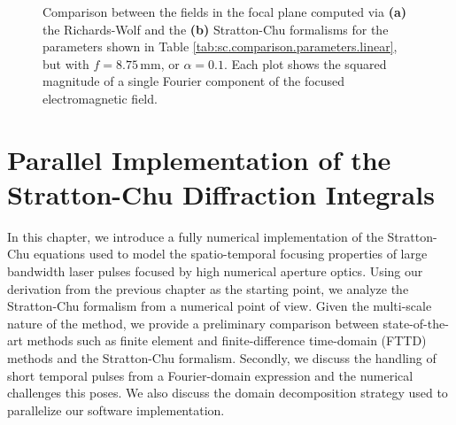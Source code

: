 \documentclass[11pt,SymmetricalJury]{inrsthesis/inrsthesis}
\newenvironment{chaptersummary}{%
  \begin{quotation}
  \SingleSpacing
  \setlength{\parskip}{\baselineskip}}{%
  \end{quotation}}
\begin{document}
\begin{figure}
  \caption[Richards-Wolf vs Stratton-Chu: fields in the focal plane, VSF.LIN.G.f0.00875.]
          {Comparison between the fields in the focal plane computed via \textbf{(a)}
          the Richards-Wolf and the \textbf{(b)} Stratton-Chu formalisms for the
          parameters shown in Table \ref{tab:sc.comparison.parameters.linear}, but
          with $f=8.75\,\si{\mm}$, or $\alpha=0.1$. Each plot shows
          the squared magnitude of a single Fourier component of the focused
          electromagnetic field.}
  \label{fig:sc.sc-vs-rw-vsf-lin-g-f0.0875}
\end{figure}



\chapter{Parallel Implementation of the Stratton-Chu Diffraction Integrals}
\label{chapter:stratton-chu}


In this chapter, we introduce a fully numerical implementation of the
Stratton-Chu equations used to model the spatio-temporal focusing properties of
large bandwidth laser pulses focused by high numerical aperture optics. Using
our derivation from the previous chapter as the starting point, we analyze the
Stratton-Chu formalism from a numerical point of view. Given the multi-scale
nature of the method, we provide a preliminary comparison between
state-of-the-art methods such as finite element and finite-difference
time-domain (FTTD) methods and the Stratton-Chu formalism. Secondly, we discuss
the handling of short temporal pulses from a Fourier-domain expression and the
numerical challenges this poses. We also discuss the domain decomposition
strategy used to parallelize our software implementation.
\end{document}
